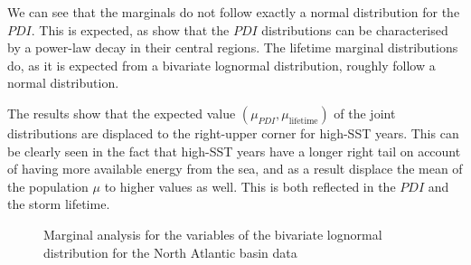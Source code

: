\medskip
We can see that the marginals do not follow exactly a normal distribution for the $PDI$. This is expected, as \textcite{Corral2010} show that the $PDI$ distributions can be characterised by a power-law decay in their central regions. The lifetime marginal distributions do, as it is expected from a bivariate lognormal distribution, roughly follow a normal distribution.

The results show that the expected value $(\mu_{PDI}, \mu_{\text{lifetime}})$ of the joint distributions are displaced to the right-upper corner for high-SST years. This can be clearly seen in the fact that high-SST years have a longer right tail on account of having more available energy from the sea, and as a result displace the mean of the population $\mu$ to higher values as well. This is both reflected in the $PDI$ and the storm lifetime.


\begin{figure}[H]
	\centering
	\caption{Marginal analysis for the variables of the bivariate lognormal distribution for the North Atlantic basin data}
	\label{fig:natl-marginals}
\end{figure}

